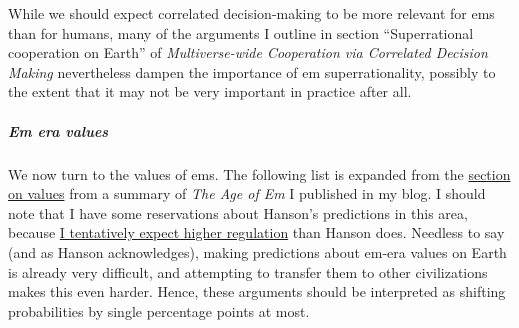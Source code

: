 \documentclass[]{article}
\let\oldsubparagraph\subparagraph
\renewcommand{\subparagraph}[1]{\oldsubparagraph{#1}\mbox{}}
\begin{document}
While we should expect correlated decision-making to be more relevant
for ems than for humans, many of the arguments I outline in section
``Superrational cooperation on Earth'' of \emph{Multiverse-wide Cooperation via
Correlated Decision Making} 
nevertheless dampen the importance of em
superrationality, possibly to the extent that it may not be very
important in practice after all.

\subparagraph{Em era values}\label{em-era-values}

We now turn to the values of ems. The following list is expanded from
the
\href{https://casparoesterheld.com/2016/08/30/the-age-of-em-summary-of-policy-relevant-information/\#Values}{section
on values} from a summary of \emph{The Age of Em} I published in my blog.
I should note that I have some reservations about Hanson's predictions
in this area, because
\href{https://casparoesterheld.com/2016/08/30/the-age-of-em-summary-of-policy-relevant-information/\#regulation}{I
tentatively expect higher regulation} than Hanson does. Needless to say
(and as Hanson acknowledges), making predictions about em-era values on
Earth is already very difficult, and attempting to transfer them to
other civilizations makes this even harder. Hence, these arguments
should be interpreted as shifting probabilities by single percentage
points at most.
\end{document}
